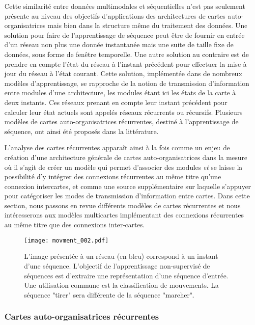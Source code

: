 \documentclass[../main]{subfiles}
\begin{document}
Cette similarité entre données multimodales et séquentielles n'est pas seulement présente au niveau des objectifs d'applications des architectures de cartes auto-organisatrices mais bien dans la structure même du traitement des données. 
Une solution pour faire de l'apprentissage de séquence peut être de fournir en entrée d'un réseau non plus une donnée instantanée mais une suite de taille fixe de données, sous forme de fenêtre temporelle.
Une autre solution au contraire est de prendre en compte l'état du réseau à l'instant précédent pour effectuer la mise à jour du réseau à l'état courant. Cette solution, implémentée dans de nombreux modèles d'apprentissage, se rapproche de la notion de transmission d'information entre modules d'une architecture, les modules étant ici les états de la carte à deux instants. 
Ces réseaux prenant en compte leur instant précédent pour calculer leur état actuels sont appelés réseaux récurrents ou récursifs.
Plusieurs modèles de cartes auto-organisatrices récurrentes, destiné à l'apprentissage de séquence, ont ainsi été proposés dans la littérature.


L'analyse des cartes récurrentes apparaît ainsi à la fois comme un enjeu de création d'une architecture générale de cartes auto-organisatrices dans la mesure où il s'agit de créer un modèle qui permet d'associer des modules \emph{et} se laisse la possibilité d'y intégrer des connexions récurrentes au même titre qu'une connexion intercartes, et comme une source supplémentaire sur laquelle s'appuyer pour catégoriser les modes de transmission d'information entre cartes. Dans cette section, nous passons en revue différents modèles de cartes récurrentes et nous intéresserons aux modèles multicartes implémentant des connexions récurrentes au même titre que des connexions inter-cartes.

\begin{figure}
    \centering\texttt{[image: movment\_002.pdf]}
    \caption{L'image présentée à un réseau (en bleu) correspond à un instant d'une séquence. L'objectif de l'apprentissage non-supervisé de séquences est d'extraire une représentation d'une séquence d'entrée. Une utilisation commune est la classification de mouvements. La séquence "tirer" sera différente de la séquence "marcher".\label{fig:mouvement}}
 \end{figure}


\subsubsection{Cartes auto-organisatrices récurrentes}
\end{document}
